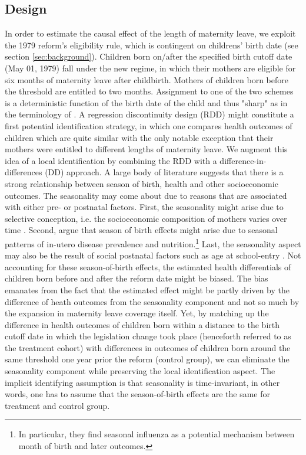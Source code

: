 \documentclass[11pt, a4paper]{article} %
\begin{document}
\subsection{Design}\label{sec:empirical_strategy_1design}
In order to estimate the causal effect of the length of maternity leave, we exploit the 1979 reform's eligibility rule, which is contingent on childrens' birth date (see section \ref{sec:background}). Children born on/after the specified birth cutoff date (May 01, 1979) fall under the new regime, in which their mothers are eligible for six months of maternity leave after childbirth. Mothers of children born before the threshold are entitled to two months. Assignment to {\color{red} one of the two schemes} is a deterministic function of the birth date of the child and thus "sharp" as in the terminology of \cite{hahn2001identification}. A regression discontinuity design (RDD) might constitute a first potential identification strategy, in which one compares health outcomes of children which are quite similar with the only notable exception that their mothers were entitled to different lengths of maternity leave.\newline 
We augment this idea of a local identification by combining the RDD with a difference-in-differences (DD) approach. A large body of literature suggests that there is a strong relationship between season of birth, health and other socioeconomic outcomes. The seasonality may come about due to reasons that are associated with either pre- or postnatal factors. First, the seasonality might arise due to selective conception, i.e. the socioeconomic composition of mothers varies over time \citep{buckles2013season}. Second, \cite{currie2013within} argue that season of birth effects might arise due to seasonal patterns of in-utero disease prevalence and nutrition.\footnote{In particular, they find seasonal influenza as a potential mechanism between month of birth and later outcomes.} Last, the seasonality aspect may also be the result of social postnatal factors such as age at school-entry \citep{black2011too}. \newline Not accounting for these season-of-birth effects, the estimated health differentials of children born before and after the reform date might be biased. The bias emanates from the fact that the estimated effect might be partly driven by the difference of heath outcomes from the seasonality component and not so much by the expansion in maternity leave coverage itself. Yet, by matching up the difference in health outcomes of children born within a distance to the birth cutoff date in which the legislation change took place (henceforth referred to as the treatment cohort) with differences in outcomes of children born around the same threshold one year prior the reform (control group), we can eliminate the seasonality component while preserving the local identification aspect. The implicit identifying assumption is that seasonality is time-invariant, in other words, one has to assume that the season-of-birth effects are the same for treatment and control group.\newline
\end{document}

